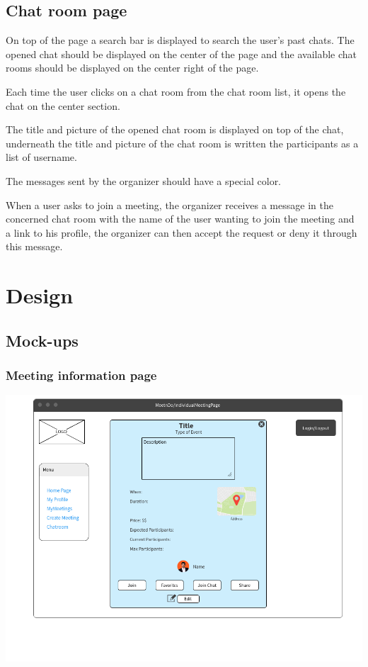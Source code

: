 \documentclass[conference]{IEEEtran}
\begin{document}
\subsection{Chat room page}

On top of the page a search bar is displayed to search the user's past chats.
The opened chat should be displayed on the center of the page and the available chat rooms should be displayed on the center right of the page.

Each time the user clicks on a chat room from the chat room list, it opens the chat on the center section. 

The title and picture of the opened chat room is displayed on top of the chat, underneath the title and picture of the chat room is written the participants as a list of username.

The messages sent by the organizer should have a special color.

When a user asks to join a meeting, the organizer receives a message in the concerned chat room with the name of the user wanting to join the meeting and a link to his profile, the organizer can then accept the request or deny it through this message.

\section{Design}

\subsection{Mock-ups}

\subsubsection{Meeting information page}

\includegraphics[scale=0.3]{mockups/IndivMeeting}
\end{document}
